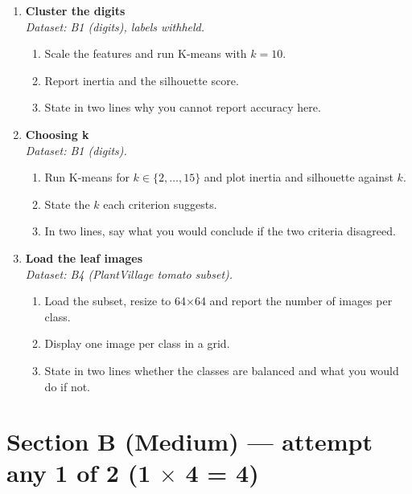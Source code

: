 \documentclass[11pt,a4paper]{article}
\begin{document}
\begin{enumerate}[label=\textbf{A\arabic*.}, leftmargin=*]

  \item \textbf{Cluster the digits} \\
    \emph{Dataset: B1 (digits), labels withheld.}
    \begin{enumerate}[label=(\alph*), leftmargin=*]
      \item Scale the features and run K-means with $k=10$.
      \item Report inertia and the silhouette score.
      \item State in two lines why you cannot report accuracy here.
    \end{enumerate}

  \item \textbf{Choosing k} \\
    \emph{Dataset: B1 (digits).}
    \begin{enumerate}[label=(\alph*), leftmargin=*]
      \item Run K-means for $k \in \{2,\dots,15\}$ and plot inertia and silhouette against $k$.
      \item State the $k$ each criterion suggests.
      \item In two lines, say what you would conclude if the two criteria disagreed.
    \end{enumerate}

  \item \textbf{Load the leaf images} \\
    \emph{Dataset: B4 (PlantVillage tomato subset).}
    \begin{enumerate}[label=(\alph*), leftmargin=*]
      \item Load the subset, resize to 64$\times$64 and report the number of images per class.
      \item Display one image per class in a grid.
      \item State in two lines whether the classes are balanced and what you would do if not.
    \end{enumerate}

\end{enumerate}

\section*{Section B (Medium) --- attempt any 1 of 2 \quad (1 $\times$ 4 = 4)}
\end{document}
